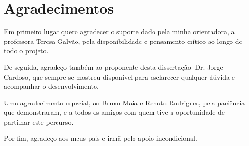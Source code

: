 \chapter*{Agradecimentos}

Em primeiro lugar quero agradecer o suporte dado pela minha orientadora, a professora Teresa Galvão, pela disponibilidade e pensamento crítico ao longo de todo o projeto.

De seguida, agradeço também ao proponente desta dissertação, Dr. Jorge Cardoso, que sempre se mostrou disponível para esclarecer qualquer dúvida e acompanhar o desenvolvimento.

Uma agradecimento especial, ao Bruno Maia e Renato Rodrigues, pela paciência que demonstraram, e a todos os amigos com quem tive a oportunidade de partilhar este percurso.

Por fim, agradeço aos meus pais e irmã pelo apoio incondicional. 

\vspace{10mm}
